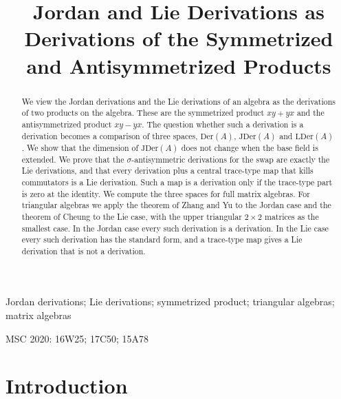 \documentclass[]{interact}
\theoremstyle{plain}
\theoremstyle{definition}
\theoremstyle{remark}
\newcommand{\Der}{\mathrm{Der}}
\newcommand{\JDer}{\mathrm{JDer}}
\newcommand{\LDer}{\mathrm{LDer}}
\newcommand{\paperversion}{10}
\begin{document}
\title{Jordan and Lie Derivations as Derivations of the Symmetrized and Antisymmetrized Products}
\author{
}

\history{Preprint version \paperversion, compiled \today}

\maketitle

\begin{abstract}
We view the Jordan derivations and the Lie derivations of an algebra as the derivations of two products on the algebra.
These are the symmetrized product $xy + yx$ and the antisymmetrized product $xy - yx$.
The question whether such a derivation is a derivation becomes a comparison of three spaces, $\Der(A)$, $\JDer(A)$ and $\LDer(A)$.
We show that the dimension of $\JDer(A)$ does not change when the base field is extended.
We prove that the $\sigma$-antisymmetric derivations for the swap are exactly the Lie derivations, and that every derivation plus a central trace-type map that kills commutators is a Lie derivation.
Such a map is a derivation only if the trace-type part is zero at the identity.
We compute the three spaces for full matrix algebras.
For triangular algebras we apply the theorem of Zhang and Yu to the Jordan case and the theorem of Cheung to the Lie case, with the upper triangular $2 \times 2$ matrices as the smallest case.
In the Jordan case every such derivation is a derivation.
In the Lie case every such derivation has the standard form, and a trace-type map gives a Lie derivation that is not a derivation.
\end{abstract}

\begin{keywords}
Jordan derivations; Lie derivations; symmetrized product; triangular algebras; matrix algebras
\end{keywords}

\begin{amscode}
MSC 2020: 16W25; 17C50; 15A78
\end{amscode}

\section{Introduction}\label{sec:intro}
\end{document}

